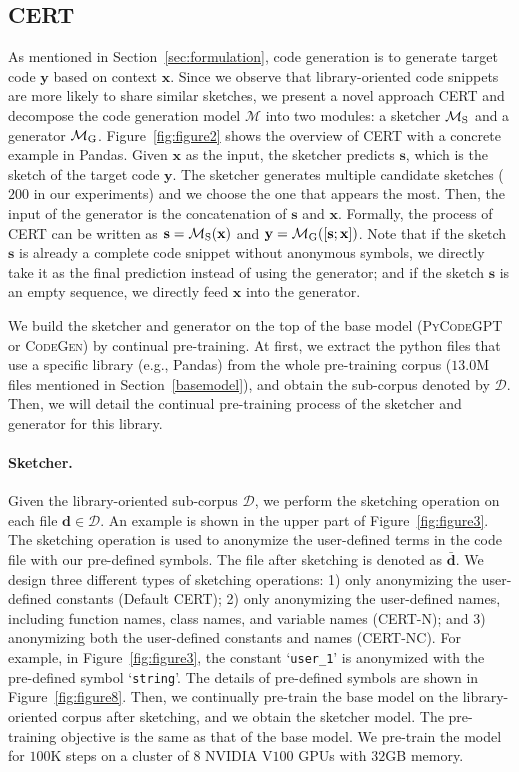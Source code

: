 \documentclass{article}
\newcommand{\cert}{\textsc{CERT}\xspace}
\newcommand{\codepy}{\textsc{PyCodeGPT}\xspace}
\newcommand{\codegen}{\textsc{CodeGen}\xspace}
\newcommand{\pandas}{Pandas\xspace}
\begin{document}
\subsection{\cert}\label{cert}
As mentioned in Section~\ref{sec:formulation}, code generation is to generate target code $\mathbf{y}$ based on context $\mathbf{x}$. 
Since we observe that library-oriented code snippets are more likely to share similar sketches, we present a novel approach \cert and decompose the code generation model $\mathcal{M}$ into two modules: a sketcher $\mathcal{M}_{\rm{S}}$ and a generator $\mathcal{M}_{\rm{G}}$.
Figure~\ref{fig:figure2} shows the overview of \cert with a concrete example in \pandas. Given $\mathbf{x}$ as the input, the sketcher predicts $\mathbf{s}$, which is the sketch of the target code $\mathbf{y}$. The sketcher generates multiple candidate sketches ($200$ in our experiments) and we choose the one that appears the most. Then, the input of the generator is the concatenation of $\mathbf{s}$ and $\mathbf{x}$. Formally, the process of \cert can be written as $\mathbf{s} =\mathcal{M}_{\rm{S}}(\mathbf{x})$ and $\mathbf{y} = \mathcal{M}_{\rm{G}}([\mathbf{s}; \mathbf{x}])$.
Note that if the sketch $\mathbf{s}$ is already a complete code snippet without anonymous symbols, we directly take it as the final prediction instead of using the generator; and if the sketch $\mathbf{s}$ is an empty sequence, we directly feed $\mathbf{x}$ into the generator. 

We build the sketcher and generator on the top of the base model (\codepy or \codegen) by continual pre-training. At first, we extract the python files that use a specific library (e.g., \pandas) from the whole pre-training corpus ($13.0$M files mentioned in Section~\ref{basemodel}), and obtain the sub-corpus denoted by $\mathcal{D}$. 
Then, we will detail the continual pre-training process of the sketcher and generator for this library.

\paragraph{Sketcher.}
Given the library-oriented sub-corpus $\mathcal{D}$, we perform the sketching operation on each file $\mathbf{d}\in\mathcal{D}$. An example is shown in the upper part of Figure~\ref{fig:figure3}. The sketching operation is used to anonymize the user-defined terms in the code file with our pre-defined symbols. The file after sketching is denoted as $\bar{\mathbf{d}}$. We design three different types of sketching operations: 1) only anonymizing the user-defined constants (Default \cert); 2) only anonymizing the user-defined names, including function names, class names, and variable names (\cert-N); and 3) anonymizing both the user-defined constants and names (\cert-NC). For example, in Figure~\ref{fig:figure3}, the constant `\texttt{user\_1}' is anonymized with the pre-defined symbol `\texttt{string}'. The details of pre-defined symbols are shown in Figure~\ref{fig:figure8}. Then, we continually pre-train the base model on the library-oriented corpus after sketching, and we obtain the sketcher model. The pre-training objective is the same as that of the base model. We pre-train the model for $100$K steps on a cluster of $8$ NVIDIA V$100$ GPUs with $32$GB memory. 
\end{document}
